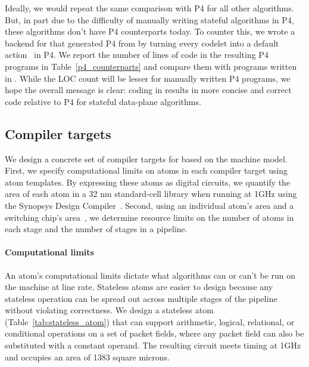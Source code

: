 Ideally, we would repeat the same comparison with P4 for all other algorithms.
But, in part due to the difficulty of manually writing stateful algorithms in
P4, these algorithms don't have P4 counterparts today. To counter this, we
wrote a backend for \pktlanguage that generated P4 from \pktlanguage by turning
every codelet into a default action~\cite{p4spec} in P4.  We report the number
of lines of code in the resulting P4 programs in Table~\ref{p4_counterparts}
and compare them with programs written in \pktlanguage. While the LOC count
will be lesser for manually written P4 programs, we hope the overall message is
clear: coding in \pktlanguage results in more concise and correct code relative
to P4 for stateful data-plane algorithms.


\subsection{Compiler targets}

We design a concrete set of compiler targets for \pktlanguage based on the
\absmachine machine model. First, we specify computational limits on atoms in
each compiler target using atom templates. By expressing these atoms as digital
circuits, we quantify the area of each atom in a 32 nm standard-cell library
when running at 1GHz using the Synopsys Design Compiler~\cite{synopsys_dc}.
Second, using an individual atom's area and a switching chip's
area~\cite{gibb_parsing}, we determine resource limits on the number of atoms
in each stage and the number of stages in a pipeline.

\paragraph{Computational limits}
An atom's computational limits dictate what algorithms can or can't be run on
the \absmachine machine at line rate. Stateless atoms are easier to design
because any stateless operation can be spread out across multiple stages of the
pipeline without violating correctness. We design a stateless atom
(Table~\ref{tab:stateless_atom}) that can support arithmetic, logical,
relational, or conditional operations on a set of packet fields, where any
packet field can also be substituted with a constant operand. The resulting
circuit meets timing at 1GHz and occupies an area of 1383 square microns.

